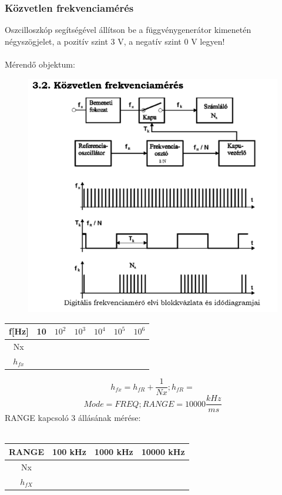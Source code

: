 \documentclass[10pt,a4paper]{article}
\begin{document}
		\subsubsection{Közvetlen frekvenciamérés}
		Oszcilloszkóp segítségével állítson be a függvénygenerátor kimenetén
négyszögjelet, a pozitív szint 3 V, a negatív szint 0 V legyen!
		\\\\
		Mérendő objektum:
		\begin{figure}[hbtp]
		\centering
		\includegraphics[scale=0.3]{teljes/kozv_frekvencia.png}
		\caption{}
		\end{figure}
		\newpage\begin{tabular}{|c|c|c|c|c|c|c|}
		\hline 
		f[Hz] & 10 & $10^2$ & $10^3$ & $10^4$ & $10^5$ & $10^6$ \\ 
		\hline 
		Nx &  &  &  &  &  &  \\ 
		\hline 
		$h_{fx}$ &  &  &  &  &  &  \\ 
		\hline 
		\end{tabular} 
		$$h_{fx} = h_{fR} + \frac{1}{Nx}; h_{fR} = $$
		$$Mode=FREQ; RANGE=10000 \frac{kHz}{ms}$$
		RANGE kapcsoló 3 állásának mérése:\\\\
		\begin{tabular}{|c|c|c|c|}
		\hline 
		RANGE & 100 kHz & 1000 kHz & 10000 kHz \\ 
		\hline 
		Nx &  &  &  \\ 
		\hline 
		$h_{fX}$ &  &  &  \\ 
		\hline 
		\end{tabular} 
		\\\\ $$$$
\end{document}
